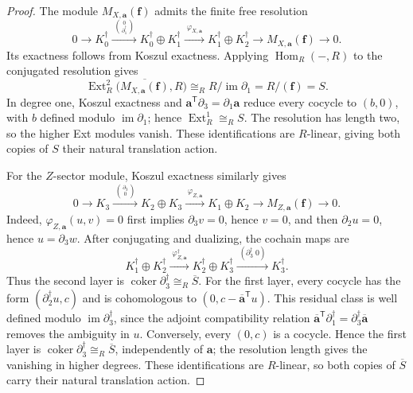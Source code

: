 \documentclass[aps,prx,english,superscriptaddress,twocolumn,tightenlines,showpacs,longbibliography,floatfix,amsfonts]{revtex4-2}
\theoremstyle{remark}
\theoremstyle{definition}
\begin{document}
\begin{proof}
	The module \(M_{X,\mathbf a}(\mathbf f)\) admits the finite free resolution
	\begin{equation}
		0\longrightarrow K_0^\dagger
		\xrightarrow{\;\binom{0}{\partial_1^\dagger}\;}
		K_0^\dagger\oplus K_1^\dagger
		\xrightarrow{\;\varphi_{X,\mathbf a}\;}
		K_1^\dagger\oplus K_2^\dagger
		\longrightarrow M_{X,\mathbf a}(\mathbf f)\longrightarrow0.
		\label{eq:block-extension-resolution}
	\end{equation}
	Its exactness follows from Koszul exactness.  Applying
	\(\operatorname{Hom}_R(-,R)\) to the conjugated resolution gives
	\begin{equation}
		\operatorname{Ext}_R^2
		\bigl(\overline{M_{X,\mathbf a}(\mathbf f)},R\bigr)
		\cong_R R/\operatorname{im}\partial_1
		=R/(\mathbf f)=S.
	\end{equation}
	In degree one, Koszul exactness and
	\(\mathbf a^{\mathsf T}\partial_3=\partial_1\mathbf a\) reduce every
	cocycle to \((b,0)\), with \(b\) defined modulo
	\(\operatorname{im}\partial_1\); hence
	\(\operatorname{Ext}_R^1\cong_R S\).  The resolution has length two, so the
	higher Ext modules vanish.  These identifications are \(R\)-linear, giving
	both copies of \(S\) their natural translation action.

	For the \(Z\)-sector module, Koszul exactness similarly gives
	\begin{equation}
		0\longrightarrow K_3
		\xrightarrow{\;\binom{\partial_3}{0}\;}
		K_2\oplus K_3
		\xrightarrow{\;\varphi_{Z,\mathbf a}\;}
		K_1\oplus K_2
		\longrightarrow M_{Z,\mathbf a}(\mathbf f)\longrightarrow0.
		\label{eq:block-extension-resolution-Z}
	\end{equation}
	Indeed, \(\varphi_{Z,\mathbf a}(u,v)=0\) first implies
	\(\partial_3v=0\), hence \(v=0\), and then
	\(\partial_2u=0\), hence \(u=\partial_3w\).
	After conjugating and dualizing, the cochain maps are
	\begin{equation}
		K_1^\dagger\oplus K_2^\dagger
		\xrightarrow{\;\varphi_{Z,\mathbf a}^\dagger\;}
		K_2^\dagger\oplus K_3^\dagger
		\xrightarrow{\;(\partial_3^\dagger\;0)\;}
		K_3^\dagger.
	\end{equation}
	Thus the second layer is
	\(\operatorname{coker}\partial_3^\dagger\cong_R\overline S\).
	For the first layer, every cocycle has the form
	\((\partial_2^\dagger u,c)\) and is cohomologous to
	\((0,c-\overline{\mathbf a}^{\mathsf T}u)\).  This residual class is
	well defined modulo \(\operatorname{im}\partial_3^\dagger\), since the
	adjoint compatibility relation
	\(\overline{\mathbf a}^{\mathsf T}\partial_1^\dagger
	=\partial_3^\dagger\overline{\mathbf a}\) removes the ambiguity in \(u\).
	Conversely, every \((0,c)\) is a cocycle. Hence the first layer is
	\(\operatorname{coker}\partial_3^\dagger\cong_R\overline S\), independently of
	\(\mathbf a\); the resolution length gives the vanishing in higher degrees.
	These identifications are \(R\)-linear, so both copies of \(\overline S\)
	carry their natural translation action.
\end{proof}
\end{document}
